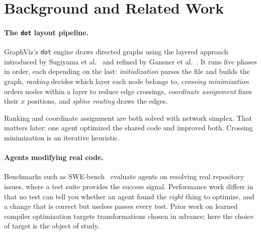 \section{Background and Related Work}
\label{sec:related}

\paragraph{The \texttt{dot} layout pipeline.}
GraphViz's \texttt{dot} engine draws directed graphs using the layered approach
introduced by Sugiyama et al.~\cite{sugiyama1981methods} and refined by Gansner
et al.~\cite{gansner1993technique}. It runs five phases in order, each
depending on the last: \emph{initialization} parses the file and builds the
graph, \emph{ranking} decides which layer each node belongs to, \emph{crossing
minimization} orders nodes within a layer to reduce edge crossings,
\emph{coordinate assignment} fixes their $x$ positions, and \emph{spline
routing} draws the edges.

Ranking and coordinate assignment are both solved with network simplex. That
matters later: one agent optimized the shared code and improved both. Crossing
minimization is an iterative heuristic.

\paragraph{Agents modifying real code.}
Benchmarks such as SWE-bench~\cite{jimenez2024swebench} evaluate agents on
resolving real repository issues, where a test suite provides the success
signal. Performance work differs in that no test can tell you whether an agent
found the \emph{right} thing to optimize, and a change that is correct but
useless passes every test. Prior work on learned compiler optimization
\cite{cummins2023llmcompiler} targets transformations chosen in advance; here
the choice of target is the object of study.

